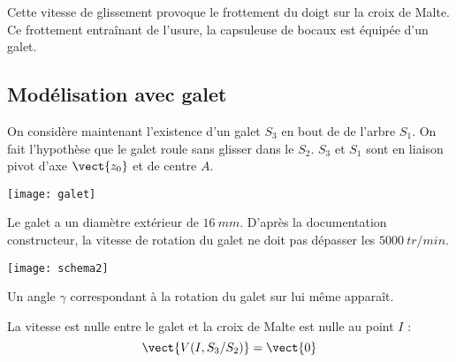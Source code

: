 
\ifprof%
\begin{corrige}

Cette vitesse de glissement provoque le frottement du doigt sur la croix de Malte. Ce frottement entraînant de l'usure, la capsuleuse de bocaux est équipée d'un galet.

\end{corrige}
\else\fi


\subsection*{Modélisation avec galet}
\ifprof
\else
On considère maintenant l'existence d'un galet $S_3$ en bout de de l'arbre $S_1$. On fait l'hypothèse que le galet roule sans glisser dans le $S_2$. $S_3$ et $S_1$ sont en liaison pivot d'axe $\vect{z_0}$ et de centre $A$.


\begin{marginfigure}
 \texttt{[image: galet]}
\end{marginfigure}

Le galet a un diamètre extérieur de $\SI{16}{mm}$. D'après la documentation constructeur, la vitesse de rotation du galet ne doit pas dépasser les $\SI{5000}{tr/min}$.



\begin{center}
 \texttt{[image: schema2]}
\end{center}
\fi

\ifprof%
\begin{corrige}

Un angle $\gamma$ correspondant à la rotation du galet sur lui même apparaît.

\end{corrige}
\else \fi

\ifprof%
\begin{corrige}
La vitesse est nulle entre le galet et la croix de Malte est nulle au point $I$ :
$$ 
\vect{V(I,S_3/S_2)} = \vect{0}
$$
\end{corrige}\else\fi

